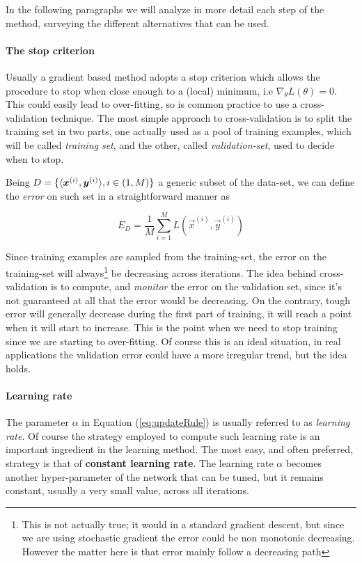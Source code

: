 In the following paragraphs we will analyze in more detail each step of the method, surveying the different alternatives 
that can be used.

\paragraph{The stop criterion}

Usually a gradient based method adopts a stop criterion which allows the procedure to stop when close enough to a (local) 
minimum, i.e $\nabla_\theta L(\theta)=0$.  This could easily lead to over-fitting, so is common practice to use a 
cross-validation technique. The most simple approach to cross-validation is to split the training set in two parts, one actually used as a pool of training examples, which will be called \textit{training set}, and the other, called \textit{validation-set}, used to decide when to stop.

Being $D=\{\langle\boldsymbol{x}^{(i)},\boldsymbol{y}^{(i)}\rangle, i\in(1,M)\}$ a generic subset of the data-set, we can define the \textit{error} on such set in a straightforward manner as 

\begin{equation}
 E_D = \frac{1}{M} \sum_{i=1}^M  L(\vec{x}^{(i)},\vec{y}^{(i)})
\end{equation}

Since training examples are sampled from the training-set, the error on the training-set will always\footnote{This is not actually true; it would in a standard gradient descent, but since we are using stochastic gradient the error could be non monotonic decreasing. However the matter here is that error mainly follow a decreasing path} be decreasing across iterations. The idea behind cross-validation is to compute, and \textit{monitor} the error on the validation set, since it's not guaranteed at all that the error would be decreasing. On the contrary, tough error will generally decrease during the first part of training, it will reach a point when it will start to increase. This is the point when we need to stop training since we are starting to over-fitting. Of course this is an ideal situation, in real applications the validation error could have a more irregular trend, but the idea holds.


\paragraph{Learning rate}

The parameter $\alpha$ in Equation (\ref{eq:updateRule}) is usually referred to as \textit{learning rate}. Of course the strategy employed to compute such learning rate is an important ingredient in the learning method.
The most easy, and often preferred, strategy is that of \textbf{constant learning rate}. The learning rate $\alpha$ becomes another hyper-parameter of the network that can be tuned, but it remains constant, usually a very small value, across all iterations.

